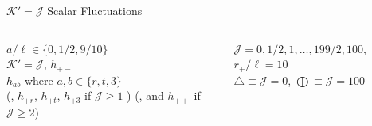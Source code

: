 \documentclass[xcolor=dvipsnames]{beamer}
\begin{document}
\begin{frame}{\(\mathcal K' = \mathcal J\) Scalar Fluctuations}
  \vfill

  \begin{columns}[c]
    \begin{column}{0.5\textwidth}
      \(a/\ell \in \{0, 1/2, 9/10\}\)\\
      \(\mathcal K' = \mathcal J\), 
      \(h_{+-}\) \\ \(h_{ab}\) where
      \(a,b \in \{r,t,3\}\)\\
      (, \(h_{+r}\), \(h_{+t}\), \(h_{+3}\) if \(\mathcal J \geq 1\) ) (, and
      \(h_{++}\) if \(\mathcal J \geq 2\))
    \end{column}

    \begin{column}{0.5\textwidth}
      \(\mathcal J = 0, 1/2, 1, \ldots, 199/2, 100\), \(r_+/\ell = 10\)\\
      \(\bigtriangleup \equiv \mathcal J = 0\),
      \(\bigoplus \equiv \mathcal J = 100\)
    \end{column}
  \end{columns}
\end{frame}
\end{document}
